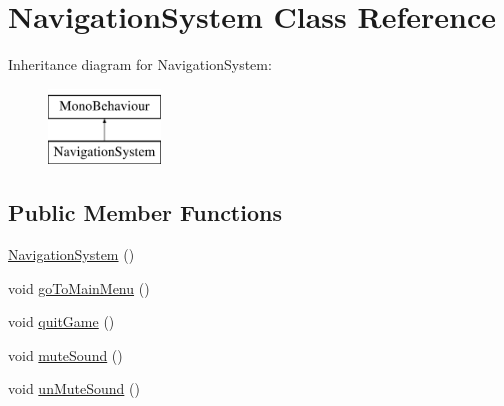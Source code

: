 \hypertarget{classNavigationSystem}{}\section{Navigation\+System Class Reference}
\label{classNavigationSystem}
Inheritance diagram for Navigation\+System\+:\begin{figure}[H]
\begin{center}
\leavevmode
\includegraphics[height=2.000000cm]{classNavigationSystem}
\end{center}
\end{figure}
\subsection*{Public Member Functions}
\begin{DoxyCompactItemize}
\item 
\hyperlink{classNavigationSystem_a30234814ed20941b34e952561614b1ca}{Navigation\+System} ()
\item 
void \hyperlink{classNavigationSystem_aa8179685d8069f6b6e650412ab7a75ec}{go\+To\+Main\+Menu} ()
\item 
void \hyperlink{classNavigationSystem_a4206e0e3e67299f2de7c73a288e47ab0}{quit\+Game} ()
\item 
void \hyperlink{classNavigationSystem_a6d8e817a046d3086da28ed37d28c227a}{mute\+Sound} ()
\item 
void \hyperlink{classNavigationSystem_af6d596ddbcc82d7d2a9c90e211daed07}{un\+Mute\+Sound} ()
\end{DoxyCompactItemize}
